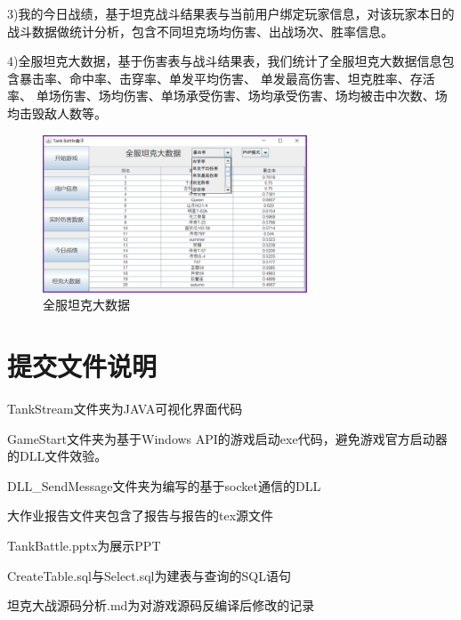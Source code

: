 \documentclass[UTF8, a4paper]{ctexart}
\begin{document}
3)我的今日战绩，基于坦克战斗结果表与当前用户绑定玩家信息，对该玩家本日的战斗数据做统计分析，包含不同坦克场均伤害、出战场次、胜率信息。


4)全服坦克大数据，基于伤害表与战斗结果表，我们统计了全服坦克大数据信息包含暴击率、命中率、击穿率、单发平均伤害、 单发最高伤害、坦克胜率、存活率、 单场伤害、场均伤害、单场承受伤害、场均承受伤害、场均被击中次数、场均击毁敌人数等。
 \begin{figure}[h]
    \centering
    \includegraphics[width=0.7\textwidth]{total.png}
    \caption{全服坦克大数据}
    \label{fig:total}
  \end{figure}


\section{提交文件说明}

TankStream文件夹为JAVA可视化界面代码

GameStart文件夹为基于Windows API的游戏启动exe代码，避免游戏官方启动器的DLL文件效验。

DLL\_SendMessage文件夹为编写的基于socket通信的DLL

大作业报告文件夹包含了报告与报告的tex源文件

TankBattle.pptx为展示PPT

CreateTable.sql与Select.sql为建表与查询的SQL语句

坦克大战源码分析.md为对游戏源码反编译后修改的记录
\end{document}
